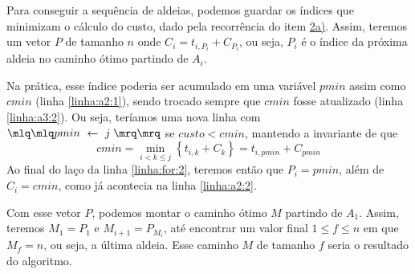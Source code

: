 Para conseguir a sequência de aldeias, podemos guardar os índices que minimizam o cálculo do custo, dado pela recorrência do item \hyperref[sec:2:a]{2a)}. Assim, teremos um vetor $P$ de tamanho $n$ onde $C_i = t_{i, P_i} + C_{P_i}$, ou seja, $P_i$ é o índice da próxima aldeia no caminho ótimo partindo de $A_i$.

Na prática, esse índice poderia ser acumulado em uma variável $pmin$ assim como $cmin$ (linha \ref{linha:a2:1}), sendo trocado sempre que $cmin$ fosse atualizado (linha \ref{linha:a3:2}). Ou seja, teríamos uma nova linha com $\mlq\mlq pmin \gets j \;\mrq\mrq$ se $custo < cmin$, mantendo a invariante de que
\[
    cmin = \min_{i < k \leq j} \left\{t_{i, k} + C_k\right\} = t_{i, pmin} + C_{pmin}
\]
Ao final do laço da linha \ref{linha:for:2}, teremos então que $P_i = pmin$, além de $C_i = cmin$, como já acontecia na linha \ref{linha:a2:2}.

Com esse vetor $P$, podemos montar o caminho ótimo $M$ partindo de $A_1$. Assim, teremos $M_1 = P_1$ e $M_{i + 1} = P_{M_i}$, até encontrar um valor final $1 \leq f \leq n$ em que $M_f = n$, ou seja, a última aldeia. Esse caminho $M$ de tamanho $f$ seria o resultado do algoritmo.

